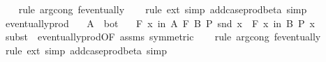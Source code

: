 \begin{isabellebody}
\ \ \isamarkupfalse%
\ {\isacharparenleft}{\kern0pt}rule\ arg{\isacharunderscore}{\kern0pt}cong{}{\isacharbrackleft}{\kern0pt}\ f{\isacharequal}{\kern0pt}{\isachardoublequoteopen}eventually{\isachardoublequoteclose}{\isacharbrackright}{\kern0pt}{\isacharparenright}{\kern0pt}\isanewline
\ \ \isamarkupfalse%
\ {\isacharparenleft}{\kern0pt}rule\ ext{\isacharcomma}{\kern0pt}\ simp\ add{\isacharcolon}{\kern0pt}case{\isacharunderscore}{\kern0pt}prod{\isacharunderscore}{\kern0pt}beta{\isacharcomma}{\kern0pt}\ simp{\isacharparenright}{\kern0pt}%
\endisatagproof
{\isafoldproof}%
%
\isadelimproof
\isanewline
%
\endisadelimproof
\isanewline
{}\isamarkupfalse%
\ eventually{\isacharunderscore}{\kern0pt}prod{}{\isacharprime}{\kern0pt}{\isacharcolon}{\kern0pt}\isanewline
\ \ \ {\isachardoublequoteopen}A\ {\isasymnoteq}\ bot{\isachardoublequoteclose}\isanewline
\ \ \ {\isachardoublequoteopen}{\isacharparenleft}{\kern0pt}{\isasymforall}\isactrlsub F\ x\ in\ A\ {\isasymtimes}\isactrlsub F\ B{\isachardot}{\kern0pt}\ P\ {\isacharparenleft}{\kern0pt}snd\ x{\isacharparenright}{\kern0pt}{\isacharparenright}{\kern0pt}\ {\isasymlongleftrightarrow}\ {\isacharparenleft}{\kern0pt}{\isasymforall}\isactrlsub F\ x\ in\ B{\isachardot}{\kern0pt}\ P\ x{\isacharparenright}{\kern0pt}{\isachardoublequoteclose}\isanewline
%
\isadelimproof
\ \ %
\endisadelimproof
%
\isatagproof
{}\isamarkupfalse%
\ {\isacharparenleft}{\kern0pt}subst\ {\isacharparenleft}{\kern0pt}{}{\isacharparenright}{\kern0pt}\ eventually{\isacharunderscore}{\kern0pt}prod{}{\isacharbrackleft}{\kern0pt}OF\ assms{\isacharparenleft}{\kern0pt}{}{\isacharparenright}{\kern0pt}{\isacharcomma}{\kern0pt}\ symmetric{\isacharbrackright}{\kern0pt}{\isacharparenright}{\kern0pt}\isanewline
\ \ \isamarkupfalse%
\ {\isacharparenleft}{\kern0pt}rule\ arg{\isacharunderscore}{\kern0pt}cong{}{\isacharbrackleft}{\kern0pt}\ f{\isacharequal}{\kern0pt}{\isachardoublequoteopen}eventually{\isachardoublequoteclose}{\isacharbrackright}{\kern0pt}{\isacharparenright}{\kern0pt}\isanewline
\ \ \isamarkupfalse%
\ {\isacharparenleft}{\kern0pt}rule\ ext{\isacharcomma}{\kern0pt}\ simp\ add{\isacharcolon}{\kern0pt}case{\isacharunderscore}{\kern0pt}prod{\isacharunderscore}{\kern0pt}beta{\isacharcomma}{\kern0pt}\ simp{\isacharparenright}{\kern0pt}%
\endisatagproof
{\isafoldproof}%
%
\isadelimproof
\isanewline
%
\endisadelimproof

\end{isabellebody}
